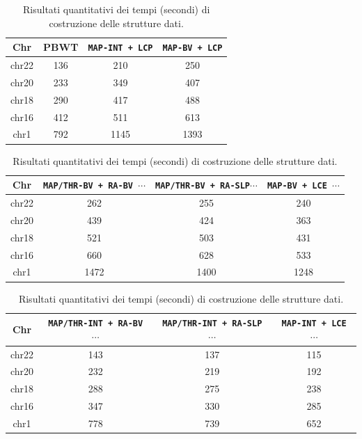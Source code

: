 \begin{table}
  \centering
  \caption{Risultati quantitativi dei tempi (secondi) di costruzione delle
    strutture dati.} 
  \label{tab:maketime}
  \footnotesize
  \begin{tabular}{c||c|c|c} 
    \textbf{Chr}
    & \textbf{PBWT}
    & \textbf{\texttt{MAP-INT \newline+ LCP}}
    & \textbf{\texttt{MAP-BV \newline+ LCP}}\\
    \hline
    \hline
    chr22 & 136 & 210 & 250 \\
    chr20 & 233 & 349 & 407 \\
    chr18 & 290 & 417 & 488 \\
    chr16 & 412 & 511 & 613 \\
    chr1 & 792 & 1145 & 1393
  \end{tabular}
  \vspace{+3mm}
  \vspace{+1mm}
  \begin{tabular}{c||c|c|c} 
    \textbf{Chr}
    & \textbf{\texttt{MAP/THR-BV + RA-BV $\cdots$}}
    & \textbf{\texttt{MAP/THR-BV + RA-SLP$\cdots$}}
    & \textbf{\texttt{MAP-BV + LCE $\cdots$}}\\
    \hline
    \hline
    chr22 & 262 & 255 & 240 \\
    chr20 & 439 & 424 & 363 \\
    chr18 & 521 & 503 & 431 \\
    chr16 & 660 & 628 & 533 \\
    chr1 & 1472 & 1400 & 1248 
  \end{tabular}
  \vspace{+3mm}
  \vspace{+1mm}
  \begin{tabular}{c||c|c|c} 
    \textbf{Chr}
    & \textbf{\texttt{MAP/THR-INT + RA-BV $\cdots$}}
    & \textbf{\texttt{MAP/THR-INT + RA-SLP $\cdots$}}
    & \textbf{\texttt{MAP-INT + LCE $\cdots$}}\\
    \hline
    \hline
    chr22 & 143 & 137 & 115 \\
    chr20 & 232 & 219 & 192 \\
    chr18 & 288 & 275 & 238 \\
    chr16 & 347 & 330 & 285 \\
    chr1 & 778 & 739 & 652

  \end{tabular}
\end{table}
